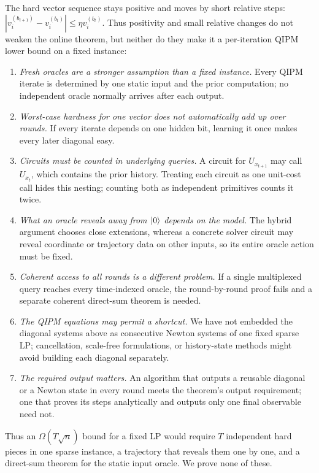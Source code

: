 The hard vector sequence stays positive and moves by short relative steps:
$|v_i^{(b_{t+1})}-v_i^{(b_t)}|\leq\eta v_i^{(b_t)}$.  Thus positivity and
small relative changes do not weaken the online theorem, but neither do they
make it a per-iteration QIPM lower bound on a fixed instance:
\begin{enumerate}[leftmargin=*]
 \item \emph{Fresh oracles are a stronger assumption than a fixed
 instance.}  Every QIPM iterate is determined by one static input
 and the prior computation; no independent oracle normally arrives after each
 output.
 \item \emph{Worst-case hardness for one vector does not automatically add up
 over rounds.}  If every iterate depends on one hidden bit, learning it once
 makes every later diagonal easy.
 \item \emph{Circuits must be counted in underlying queries.}  A
 circuit for $U_{x_{t+1}}$ may call $U_{x_t}$, which contains the prior
 history.  Treating each circuit as one unit-cost call hides this nesting;
 counting both as independent primitives counts it twice.
 \item \emph{What an oracle reveals away from $\lvert 0\rangle$ depends on the model.}
 The hybrid argument chooses close extensions, whereas a concrete solver
 circuit may reveal coordinate or trajectory data on other inputs, so its
 entire oracle action must be fixed.
 \item \emph{Coherent access to all rounds is a different problem.}  If a
 single multiplexed query reaches every time-indexed oracle, the round-by-round
 proof fails and a separate coherent direct-sum theorem is needed.
 \item \emph{The QIPM equations may permit a shortcut.}  We have not embedded
 the diagonal systems above as consecutive Newton systems of one fixed sparse
 LP; cancellation, scale-free formulations, or history-state methods might
 avoid building each diagonal separately.
 \item \emph{The required output matters.}  An algorithm that outputs a
 reusable diagonal or a Newton state in every round meets the theorem's
 output requirement; one that proves its steps analytically and outputs only
 one final observable need not.
\end{enumerate}
Thus an $\Omega(T\sqrt n)$ bound for a fixed LP would require $T$
independent hard pieces in one sparse instance, a trajectory that reveals
them one by one, and a direct-sum theorem for the static input oracle.  We
prove none of these.

